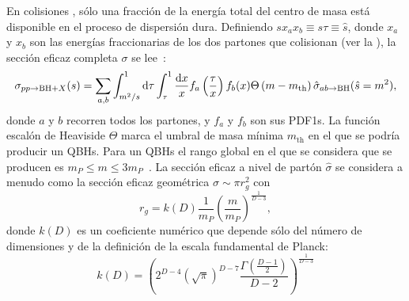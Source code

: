 En colisiones \pp, sólo una fracción de la energía total del centro de masa \sqs está disponible en el proceso de dispersión dura. Definiendo \(sx_ax_b \equiv s \tau \equiv \hat{s}\), donde \(x_a\) y \(x_b\) son las energías fraccionarias de los dos partones que colisionan (ver la \Sect{\ref{subsec:theory:sm:hadron_interactions}}), la sección eficaz completa \(\sigma\) se lee~\cite{Gingrich_Undseth-2020}:
\begin{equation*}
    \sigma_{pp \rightarrow \text{BH} + X}(s) =
    \sum_{a,b}
        \int_{m^2/s}^{1} \dd{\tau}
            \int_{\tau}^{1}
            \frac{\dd{x}}{x}
            f_a\left(\frac{\tau}{x}\right)
            f_b(x)
            \Theta\left(m - m_{\text{th}}\right)
            \hat{\sigma}_{ab\rightarrow \text{BH}} (\hat{s} = m^2),
\end{equation*}
donde \(a\) y \(b\) recorren todos los partones, y \(f_a\) y \(f_b\) son sus \acp{PDF1}. La función escalón de Heaviside \(\Theta\) marca el umbral de masa mínima \(m_{\text{th}}\) en el que se podría producir un \acp{QBH}.
Para un \acp{QBH} el rango global en el que se considera que se producen es \(m_P \leq m \leq 3m_P\)~\cite{Gingrich-2010}.
La sección eficaz a nivel de part\'on \(\hat{\sigma}\) se considera a menudo como la sección eficaz geométrica \(\sigma \sim \pi r_g^2\) con
\begin{equation*}
    r_g = k(D) \frac{1}{m_P} \left(\frac{m}{m_P}\right)^{\frac{1}{D-3}},
\end{equation*}
donde \(k(D)\) es un coeficiente numérico que depende sólo del número de dimensiones y de la definición de la escala fundamental de Planck:
\begin{equation*}
    k(D) = 
    \left(
        2^{D-4}
        \left(\sqrt{\pi}\right)^{D-7}
        \frac{\Gamma \left(\frac{D-1}{2}\right)}{D-2}
    \right)
    ^{\frac{1}{D-3}}
\end{equation*}

